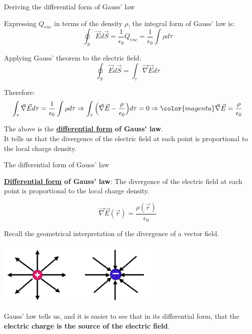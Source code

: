 %
%
%

\begin{frame}{Deriving the differential form of Gauss' law}

Expressing $Q_{enc}$ in terms of the density $\rho$,
the integral form of Gauss' law is:
\begin{equation*}
   \oint_{S} \vec{E} d\vec{S} = \frac{1}{\epsilon_0} Q_{enc} =  \frac{1}{\epsilon_0} \int \rho d\tau
\end{equation*}

Applying Gauss' theorem to the electric field:
\begin{equation*}
   \oint_{S} \vec{E} d\vec{S} = \int_{\tau} \vec{\nabla} \vec{E} d\tau
\end{equation*}

Therefore:
\begin{equation*}
  \int_{\tau} \vec{\nabla} \vec{E} d\tau = \frac{1}{\epsilon_0} \int \rho d\tau \Rightarrow
  \int_{\tau} \Big( \vec{\nabla} \vec{E} - \frac{\rho}{\epsilon_0} \Big) d\tau = 0 \Rightarrow
  {\color{magenta} \vec{\nabla} \vec{E} = \frac{\rho}{\epsilon_0}}
\end{equation*}

The above is the {\bf \underline{differential form} of Gauss' law}.\\
It tells us that the divergence of the electric field at each point is proportional to the local charge density.

\end{frame}


%
%
%

\begin{frame}{The differential form of Gauss' law}

{\bf \underline{Differential form} of Gauss' law}:
The divergence of the electric field at each point is proportional to the local charge density.

\begin{equation*}
  \vec{\nabla} \vec{E}(\vec{r}) = \frac{\rho(\vec{r})}{\epsilon_0}
\end{equation*}

Recall the geometrical interpretation of the divergence of a vector field.\\
\begin{center}
  \includegraphics[width=0.60\textwidth]{./images/schematics/electric_field_lines_pos_and_neg_point_charges_1.png}\\
\end{center}

Gauss' law tells us, and it is easier to see that in its differential form, that
the {\bf electric charge is the source of the electric field}.

\end{frame}

